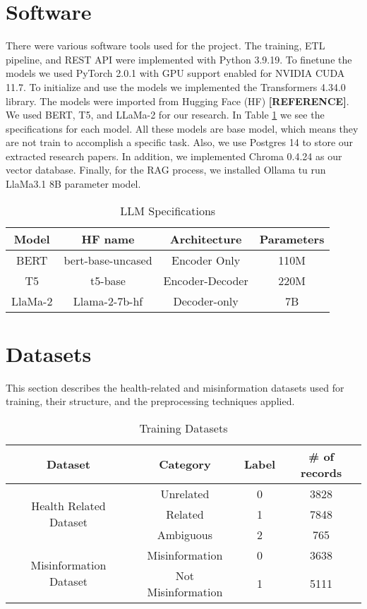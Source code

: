 \section{Software}
There were various software tools used for the project. The training, ETL pipeline,
and REST API were implemented with Python 3.9.19. To finetune the models we used PyTorch 2.0.1 with GPU support enabled for
NVIDIA CUDA 11.7. To initialize and use the models we implemented the Transformers  4.34.0 library. The models were imported from
Hugging Face (HF) \textbf{[REFERENCE]}. We used BERT, T5, and LLaMa-2 for our research. In Table \ref{table:LLM} we see the specifications
for each model. All these models are base model, which means they are not train to accomplish a specific task. Also, we use Postgres 14 to store our extracted research papers. In addition, we implemented Chroma 0.4.24 as our vector database.
Finally, for the RAG process, we installed Ollama tu run LlaMa3.1 8B parameter model. 


  \begin{table}[ht!]
\centering
\caption{LLM Specifications}
\begin{tabular}{||c | c | c | c||} 
 \hline
\textbf{Model} & \textbf{HF name} & \textbf{Architecture} & \textbf{Parameters} \\ [0.5ex] 
 \hline
 BERT & bert-base-uncased & Encoder Only & 110M \\ 
 \hline
 T5 & t5-base & Encoder-Decoder & 220M \\
 \hline
 LlaMa-2 & Llama-2-7b-hf & Decoder-only & 7B \\
 \hline
\end{tabular}
\label{table:LLM}
\end{table}
 


\section{Datasets}

This section describes the health-related and misinformation datasets used for training, their structure, and the preprocessing techniques applied.

\begin{table}[H]
	\centering
	\caption{Training Datasets}
	\begin{tabular}{||c | c | c| c||} 
		\hline
		\textbf{Dataset} &
		\textbf{Category} & \textbf{Label}& \textbf{\# of records} \\ [1.5ex] 
		\hline
		\multirow{3}{6.75em}{Health Related Dataset} & Unrelated & 0 & 3828  \\[1ex]
		& Related & 1 & 7848  \\ [1ex]
		& Ambiguous & 2 & 765 \\[1ex]
		\hline
		\multirow{2}{6.75em}{Misinformation Dataset} & Misinformation & 0 & 3638\\ [1ex]
		& Not Misinformation & 1 & 5111  \\[1ex]
		\hline
	\end{tabular}
	\label{table:dataset}
\end{table}


